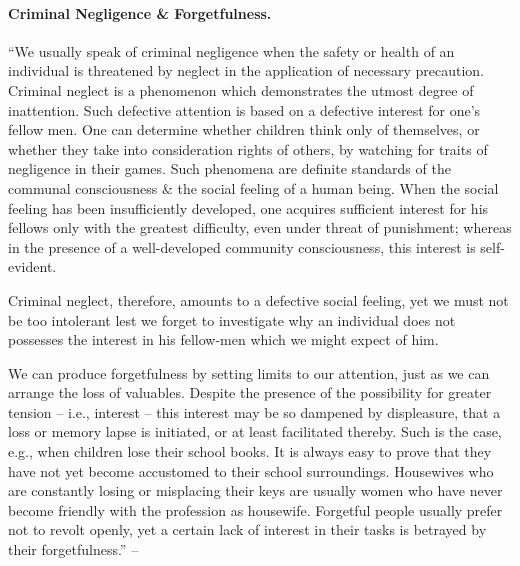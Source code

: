 \documentclass{article}
\begin{document}
\paragraph{Criminal Negligence \& Forgetfulness.} ``We usually speak of criminal negligence when the safety or health of an individual is threatened by neglect in the application of necessary precaution. Criminal neglect is a phenomenon which demonstrates the utmost degree of inattention. Such defective attention is based on a defective interest for one's fellow men. One can determine whether children think only of themselves, or whether they take into consideration rights of others, by watching for traits of negligence in their games. Such phenomena are definite standards of the communal consciousness \& the social feeling of a human being. When the social feeling has been insufficiently developed, one acquires sufficient interest for his fellows only with the greatest difficulty, even under threat of punishment; whereas in the presence of a well-developed community consciousness, this interest is self-evident.

Criminal neglect, therefore, amounts to a defective social feeling, yet we must not be too intolerant lest we forget to investigate why an individual does not possesses the interest in his fellow-men which we might expect of him.

We can produce forgetfulness by setting limits to our attention, just as we can arrange the loss of valuables. Despite the presence of the possibility for greater tension -- i.e., interest -- this interest may be so dampened by displeasure, that a loss or memory lapse is initiated, or at least facilitated thereby. Such is the case, e.g., when children lose their school books. It is always easy to prove that they have not yet become accustomed to their school surroundings. Housewives who are constantly losing or misplacing their keys are usually women who have never become friendly with the profession as housewife. Forgetful people usually prefer not to revolt openly, yet a certain lack of interest in their tasks is betrayed by their forgetfulness.'' -- \cite[pp. 96--97]{Adler_human_nature}
\end{document}
